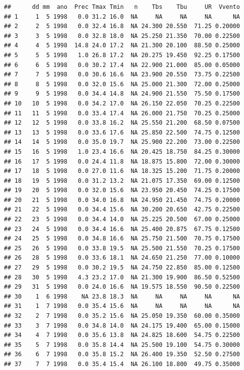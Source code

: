 \documentclass[
]{book}
\begin{document}
\begin{verbatim}
##      dd mm  ano  Prec Tmax Tmin   n    Tbs    Tbu     UR  Vvento
## 1     1  5 1998   0.0 31.2 16.0  NA     NA     NA     NA      NA
## 2     2  5 1998   0.0 32.4 16.8  NA 24.300 20.550  71.25 0.20000
## 3     3  5 1998   0.0 32.8 18.0  NA 25.250 21.350  70.00 0.22500
## 4     4  5 1998  14.8 24.0 17.2  NA 21.300 20.100  88.50 0.25000
## 5     5  5 1998   1.0 26.8 17.2  NA 20.275 19.450  92.25 0.17500
## 6     6  5 1998   0.0 30.2 17.4  NA 22.900 21.000  85.00 0.05000
## 7     7  5 1998   0.0 30.6 16.6  NA 23.900 20.550  73.75 0.22500
## 8     8  5 1998   0.0 32.0 15.6  NA 25.000 21.300  72.00 0.25000
## 9     9  5 1998   0.0 34.4 14.8  NA 24.900 21.550  75.50 0.17500
## 10   10  5 1998   0.0 34.2 17.0  NA 26.150 22.050  70.25 0.22500
## 11   11  5 1998   0.0 33.4 17.4  NA 26.000 21.750  70.25 0.25000
## 12   12  5 1998   0.0 33.8 16.2  NA 25.550 21.200  68.50 0.07500
## 13   13  5 1998   0.0 33.6 17.6  NA 25.850 22.500  74.75 0.12500
## 14   14  5 1998   0.0 35.0 19.7  NA 25.900 22.200  73.00 0.22500
## 15   16  5 1998   1.0 23.4 16.6  NA 20.425 18.750  84.25 0.30000
## 16   17  5 1998   0.0 24.4 11.8  NA 18.875 15.800  72.00 0.30000
## 17   18  5 1998   0.0 27.0 11.6  NA 18.325 15.200  71.75 0.20000
## 18   19  5 1998   0.0 31.2 13.2  NA 21.075 17.350  69.00 0.12500
## 19   20  5 1998   0.0 32.0 15.6  NA 23.950 20.450  74.25 0.17500
## 20   21  5 1998   0.0 34.0 16.8  NA 24.950 21.450  74.75 0.20000
## 21   22  5 1998   0.0 34.4 15.6  NA 30.200 20.650  42.75 0.22500
## 22   23  5 1998   0.0 34.4 14.0  NA 25.225 20.500  67.00 0.25000
## 23   24  5 1998   0.0 34.4 16.6  NA 25.400 20.875  67.75 0.12500
## 24   25  5 1998   0.0 34.8 16.6  NA 25.750 21.500  70.75 0.17500
## 25   26  5 1998   0.0 33.8 19.5  NA 25.500 21.550  70.25 0.17500
## 26   28  5 1998   0.0 33.6 18.1  NA 24.650 21.250  77.00 0.10000
## 27   29  5 1998   0.0 30.2 19.5  NA 24.750 22.850  85.00 0.12500
## 28   30  5 1998   4.3 23.2 17.0  NA 21.300 19.900  86.50 0.52500
## 29   31  5 1998   0.0 24.0 16.6  NA 19.575 18.550  90.50 0.22500
## 30    1  6 1998    NA 23.8 18.3  NA     NA     NA     NA      NA
## 31    1  7 1998   0.0 35.4 15.6  NA     NA     NA     NA      NA
## 32    2  7 1998   0.0 35.2 15.6  NA 25.050 19.350  60.00 0.35000
## 33    3  7 1998   0.0 34.8 14.0  NA 24.175 19.400  65.00 0.15000
## 34    4  7 1998   0.0 35.6 13.8  NA 24.825 18.600  54.75 0.22500
## 35    5  7 1998   0.0 35.8 14.4  NA 25.500 19.100  54.75 0.30000
## 36    6  7 1998   0.0 35.8 15.2  NA 26.400 19.350  52.50 0.27500
## 37    7  7 1998   0.0 35.4 15.4  NA 26.100 18.800  49.75 0.35000

\end{verbatim}
\end{document}
